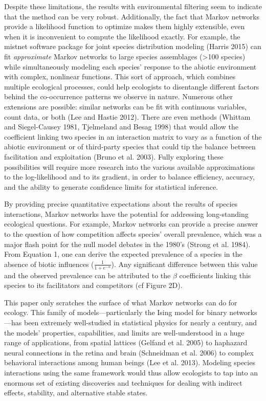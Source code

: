 \documentclass[12pt,]{article}
\begin{document}
\begin{spacing}{1.9}
\begin{flushleft}
Despite these limitations, the results with environmental filtering seem
to indicate that the method can be very robust. Additionally, the fact
that Markov networks provide a likelihood function to optimize makes
them highly extensible, even when it is inconvenient to compute the
likelihood exactly. For example, the mistnet software package for joint
species distribution modeling (Harris 2015) can fit \emph{approximate}
Markov networks to large species assemblages (\textgreater{}100 species)
while simultaneously modeling each species' response to the abiotic
environment with complex, nonlinear functions. This sort of approach,
which combines multiple ecological processes, could help ecologists to
disentangle different factors behind the co-occurrence patterns we
observe in nature. Numerous other extensions are possible: similar
networks can be fit with continuous variables, count data, or both (Lee
and Hastie 2012). There are even methods (Whittam and Siegel-Causey
1981, Tjelmeland and Besag 1998) that would allow the coefficient
linking two species in an interaction matrix to vary as a function of
the abiotic environment or of third-party species that could tip the
balance between facilitation and exploitation (Bruno et al. 2003). Fully
exploring these possibilities will require more research into the
various available approximations to the log-likelihood and to its
gradient, in order to balance efficiency, accuracy, and the ability to
generate confidence limits for statistical inference.

By providing precise quantitative expectations about the results of
species interactions, Markov networks have the potential for addressing
long-standing ecological questions. For example, Markov networks can
provide a precise answer to the question of how competition affects
species' overall prevalence, which was a major flash point for the null
model debates in the 1980's (Strong et al. 1984). From Equation 1, one
can derive the expected prevalence of a species in the absence of biotic
influences (\(\frac{1}{1 + e^{-\alpha}}\)). Any significant difference
between this value and the observed prevalence can be attributed to the
\(\beta\) coefficients linking this species to its facilitators and
competitors (cf Figure 2D).

This paper only scratches the surface of what Markov networks can do for
ecology. This family of models---particularly the Ising model for binary
networks---has been extremely well-studied in statistical physics for
nearly a century, and the models' properties, capabilities, and limits
are well-understood in a huge range of applications, from spatial
lattices (Gelfand et al. 2005) to haphazard neural connections in the
retina and brain (Schneidman et al. 2006) to complex behavioral
interactions among human beings (Lee et al. 2013). Modeling species
interactions using the same framework would thus allow ecologists to tap
into an enormous set of existing discoveries and techniques for dealing
with indirect effects, stability, and alternative stable states.


\end{flushleft}
\end{spacing}
\end{document}
